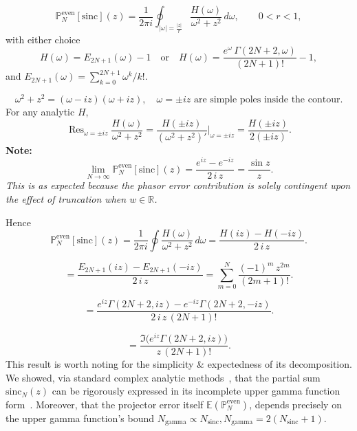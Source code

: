 \[
\mathbb{P}_N^{\text{even}}[\mathrm{sinc}](z)
= \frac{1}{2\pi i}\oint_{|\omega|=\frac{|z|}{r}}
\frac{H(\omega)}{\omega^2+z^2}\,d\omega,
\qquad 0<r<1,
\]
with either choice
\[
H(\omega)=E_{2N+1}(\omega)-1
\quad\text{or}\quad
H(\omega)=\frac{e^{\omega}\,\Gamma(2N+2,\omega)}{(2N+1)!}-1,
\]
and \(E_{2N+1}(\omega)=\sum_{k=0}^{2N+1}\omega^k/k!\).

\[
\omega^2+z^2=(\omega-iz)(\omega+iz),\quad
\omega=\pm iz \text{ are simple poles inside the contour}.
\]
For any analytic \(H\),
\[
\operatorname{Res}_{\omega=\pm iz}\frac{H(\omega)}{\omega^2+z^2}
=\frac{H(\pm iz)}{(\omega^2+z^2)'}\bigg|_{\omega=\pm iz}
=\frac{H(\pm iz)}{2(\pm i z)}.
\]
\bigskip
\noindent \textbf{Note: }
\[
\lim_{N\to\infty}\mathbb{P}_N^{\text{even}}[\mathrm{sinc}](z)
=\frac{e^{iz}-e^{-iz}}{2\,i\,z}
=\frac{\sin z}{z}.
\]
\emph{This is as expected because the phasor error contribution is solely contingent upon the effect of truncation when $w \in \mathbb{R}$.}
\bigskip

\noindent Hence
\[
\mathbb{P}_N^{\text{even}}[\mathrm{sinc}](z)
=\frac{1}{2\pi i}\oint \frac{H(\omega)}{\omega^2+z^2}\,d\omega
=\frac{H(iz)-H(-iz)}{2\,i\,z}.
\]

\[
=\frac{E_{2N+1}(iz)-E_{2N+1}(-iz)}{2\,i\,z}
=\sum_{m=0}^{N}\frac{(-1)^m\,z^{2m}}{(2m+1)!}.
\]

\[
=\frac{e^{iz}\Gamma(2N+2,iz)-e^{-iz}\Gamma(2N+2,-iz)}{2\,i\,z\,(2N+1)!}.
\]

\[
\boxed{\;
=\frac{\Im\!\big(e^{iz}\Gamma(2N+2,iz)\big)}{z\,(2N+1)!}.
\;}
\]
This result is worth noting for the simplicity \& expectedness of its decomposition. We showed, via standard complex analytic methods~\cite{Ahlfors1979,Stein2003}, that the partial sum $\mathrm{sinc}_N(z)$ can be rigorously expressed in its incomplete upper gamma function form~\cite{NIST:DLMF,Temme1996}. Moreover, that the projector error itself $\mathbb{E}(\mathbb{P}_N^{\text{even}})$, depends precisely on the upper gamma function's bound $N_{\text{gamma}} \propto N_{\text{sinc}}, N_{\text{gamma}} = 2(N_{\text{sinc}}+1)$.
\bigskip

